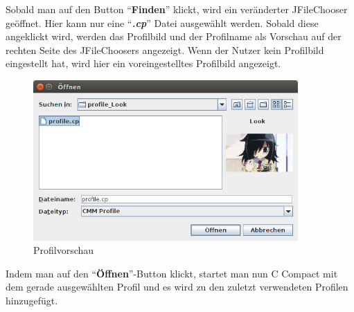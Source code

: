 Sobald man auf den Button "`\textbf{Finden}"' klickt, wird ein veränderter JFileChooser geöffnet. Hier kann nur eine "`\textit{\textbf{.cp}}"' Datei ausgewählt werden. Sobald diese angeklickt wird, werden das Profilbild und der Profilname als Vorschau auf der rechten Seite des JFileChoosers angezeigt. Wenn der Nutzer kein Profilbild eingestellt hat, wird hier ein voreingestelltes Profilbild angezeigt.

\begin{figure}[h] 
   \centering
     \includegraphics[width=0.9\textwidth]{./media/images/gui/launcher/launcher_finden.png}
  \caption{ Profilvorschau}
  \label{fig:Bild1}
\end{figure}

Indem man auf den "`\textbf{Öffnen}"'-Button klickt, startet man nun C Compact mit dem gerade ausgewählten Profil und es wird zu den zuletzt verwendeten Profilen hinzugefügt.
